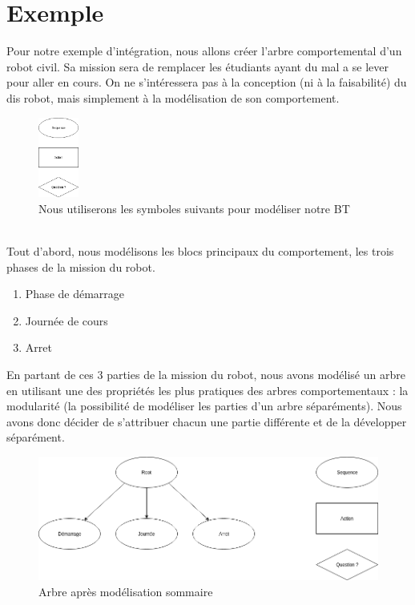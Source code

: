 \documentclass[titlepage]{article}
\begin{document}
	\section{Exemple}
	Pour notre exemple d'intégration, nous allons créer l'arbre comportemental d'un robot civil. Sa mission sera de remplacer les étudiants ayant du mal a se lever pour aller en cours. On ne s'intéressera pas à la conception (ni à la faisabilité) du dis robot, mais simplement à la modélisation de son comportement. 
	\\
	\begin{figure}[h!]
		\centering
		\includegraphics[width=50px]{img/BT_1.png}
		\caption{Nous utiliserons les symboles suivants pour modéliser notre BT}
		\label{fig:exemple_1}
	\end{figure}
	\\
	Tout d'abord, nous modélisons les blocs principaux du comportement, les trois phases de la mission du robot.
	\begin{enumerate}
		\item Phase de démarrage
		\item Journée de cours
		\item Arret
	\end{enumerate}
	En partant de ces 3 parties de la mission du robot, nous avons modélisé un arbre en utilisant une des propriétés les plus pratiques des arbres comportementaux : la modularité (la possibilité de modéliser les parties d'un arbre séparéments). \cite{iliffe_andrea_marlow_rachel_phillips_alexander_petter_2018}
	Nous avons donc décider de s'attribuer chacun une partie différente et de la développer séparément.
	\\
	\begin{figure}[h!]
		\centering
		\includegraphics[width=\linewidth]{img/BT_2.png}
		\caption{Arbre après modélisation sommaire}
		\label{fig:exemple_2}
	\end{figure}
	\\
\end{document}

